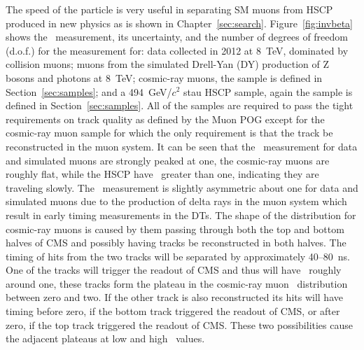 The speed of the particle is very useful in separating SM muons from HSCP produced in new physics as is shown in Chapter~\ref{sec:search}.
Figure~\ref{fig:invbeta} shows the \invbeta\ measurement, its uncertainty, and the number of degrees of freedom (d.o.f.) for the measurement for:
data collected in 2012 at 8~TeV, dominated by collision muons; 
muons from the simulated Drell-Yan (DY) production of Z bosons and photons at 8~TeV; cosmic-ray muons, the sample is defined in Section~\ref{sec:samples};
and a 494~GeV/$c^2$ stau HSCP sample, again the sample is defined in Section~\ref{sec:samples}. All of the samples are required to pass the tight requirements on track quality
as defined by the Muon POG except for the cosmic-ray muon sample for which the only requirement is that the track be reconstructed in the muon system.
It can be seen that the \invbeta\ measurement for data and simulated muons are strongly peaked at one, the cosmic-ray muons are roughly flat, while
the HSCP have \invbeta\ greater than one, indicating they are traveling slowly. The \invbeta\ measurement is slightly asymmetric about one for data and simulated muons
due to the production of delta rays in the muon system which result in early timing measurements in the DTs. The shape of the distribution for cosmic-ray muons
is caused by them passing through both the top and bottom halves of CMS and possibly having tracks be reconstructed in both halves.
The timing of hits from the two tracks will be separated by approximately 40--80~ns.
One of the tracks will trigger the readout of CMS and thus will have \invbeta\ roughly around one, these tracks form the plateau in the cosmic-ray muon \invbeta\
distribution between zero and two. If the other track is also reconstructed its hits will have timing before zero, if the bottom track triggered the readout of CMS, or
after zero, if the top track triggered the readout of CMS. These two possibilities cause the adjacent plateaus at low and high \invbeta\ values.

